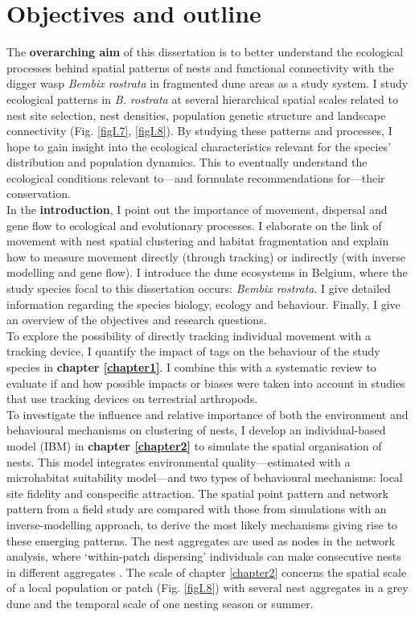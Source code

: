 \documentclass[10pt, twoside]{book} %
\begin{document}
	\section{Objectives and outline}
	The \textbf{overarching aim} of this dissertation is to better understand the ecological processes behind spatial patterns of nests and functional connectivity with the digger wasp \textit{Bembix rostrata} in fragmented dune areas as a study system. I study ecological patterns in \textit{B. rostrata} at several hierarchical spatial scales related to nest site selection, nest densities, population genetic structure and landscape connectivity (Fig. \ref{figI.7}, \ref{figI.8}). By studying these patterns and processes, I hope to gain insight into the ecological characteristics relevant for the species' distribution and population dynamics. This to eventually understand the ecological conditions relevant to---and formulate recommendations for---their conservation.\\
	
	In the \textbf{introduction}, I point out the importance of movement, dispersal and gene flow to ecological and evolutionary processes. I elaborate on the link of movement with nest spatial clustering and habitat fragmentation and explain how to measure movement directly (through tracking) or indirectly (with inverse modelling and gene flow). I introduce the dune ecosystems in Belgium, where the study species focal to this dissertation occurs: \textit{Bembix rostrata}. I give detailed information regarding the species biology, ecology and behaviour. Finally, I give an overview of the objectives and research questions.\\
	
	To explore the possibility of directly tracking individual movement with a tracking device, I quantify the impact of tags on the behaviour of the study species in \textbf{chapter \ref{chapter1}}. I combine this with a systematic review to evaluate if and how possible impacts or biases were taken into account in studies that use tracking devices on terrestrial arthropods.\\
	
	To investigate the influence and relative importance of both the environment and behavioural mechanisms on clustering of nests, I develop an individual-based model (IBM) in \textbf{chapter \ref{chapter2}} to simulate the spatial organisation of nests. This model integrates environmental quality---estimated with a microhabitat suitability model---and two types of behavioural mechanisms: local site fidelity and conspecific attraction. The spatial point pattern and network pattern from a field study are compared with those from simulations with an inverse-modelling approach, to derive the most likely mechanisms giving rise to these emerging patterns. The nest aggregates are used as nodes in the network analysis, where `within-patch dispersing' individuals can make consecutive nests in different aggregates \citep[i.e. small scale breeding dispersal;][]{ronce2007}. The scale of chapter \ref{chapter2} concerns the spatial scale of a local population or patch (Fig. \ref{figI.8}) with several nest aggregates in a grey dune and the temporal scale of one nesting season or summer.\\
	
\end{document}
